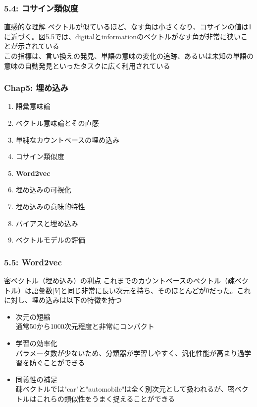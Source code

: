 \documentclass[unicode,11pt]{beamer} %
\begin{document}
\begin{frame}
    \frametitle{5.4: コサイン類似度}
    \begin{alertblock}{直感的な理解}
        ベクトルが似ているほど、なす角は小さくなり、コサインの値は1に近づく。図5.5では、digitalとinformationのベクトルがなす角が非常に狭いことが示されている
        \\この指標は、言い換えの発見、単語の意味の変化の追跡、あるいは未知の単語の意味の自動発見といったタスクに広く利用されている
    \end{alertblock}
\end{frame}


\begin{frame}
    \frametitle{Chap5: 埋め込み}
    \begin{block}{}
        \begin{enumerate}
            \item 語彙意味論
            \item ベクトル意味論とその直感
            \item 単純なカウントベースの埋め込み
            \item コサイン類似度
            \item {\color{red}\textbf{Word2vec}}
            \item 埋め込みの可視化
            \item 埋め込みの意味的特性
            \item バイアスと埋め込み
            \item ベクトルモデルの評価
        \end{enumerate}
    \end{block}
\end{frame}

\begin{frame}
    \frametitle{5.5: Word2vec}
    \begin{alertblock}{密ベクトル（埋め込み）の利点}
        これまでのカウントベースのベクトル（疎ベクトル）は語彙数$|V|$と同じ非常に長い次元を持ち、そのほとんどが0だった。これに対し、埋め込みは以下の特徴を持つ
        \begin{itemize}
            \item 次元の短縮\\通常50から1000次元程度と非常にコンパクト
            \item 学習の効率化\\パラメータ数が少ないため、分類器が学習しやすく、汎化性能が高まり過学習を防ぐことができる
            \item 同義性の補足\\疎ベクトルでは"car"と"automobile"は全く別次元として扱われるが、密ベクトルはこれらの類似性をうまく捉えることができる
        \end{itemize}
    \end{alertblock}
\end{frame}
\end{document}
